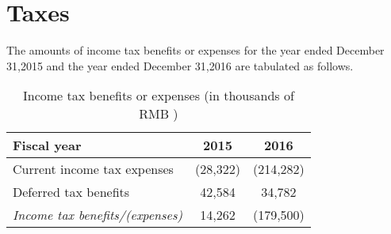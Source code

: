 

\chapter{Taxes}

The amounts of income tax benefits or expenses for the year ended December 31,2015 and the year ended December 31,2016 are tabulated as follows.

\begin{table}[H]	
	\begin{center}
		\begin{tabular}{lcc}
			\toprule
			\textbf{Fiscal year}&\textbf{2015}&\textbf{2016}\\
			\midrule
			Current income tax expenses&(28,322)&(214,282)\\
			Deferred tax benefits&42,584&34,782\\
			\qquad\emph{Income tax benefits/(expenses)}&14,262&(179,500)\\
			\bottomrule
		\end{tabular}
	\end{center}
	\caption{Income tax benefits or expenses (in thousands of RMB \textyen)}\label{table:1}
\end{table}


